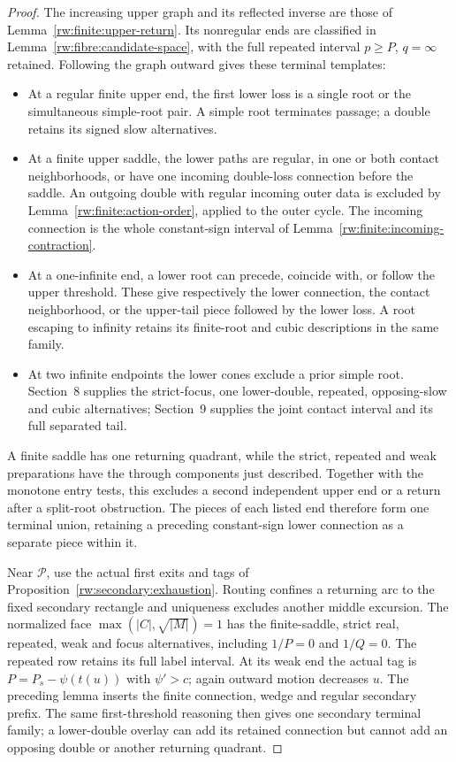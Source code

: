 \begin{proof}
The increasing upper graph and its reflected inverse are those of
Lemma~\ref{rw:finite:upper-return}. Its nonregular ends are classified
in Lemma~\ref{rw:fibre:candidate-space}, with the full repeated
interval $p\ge P$, $q=\infty$ retained. Following the graph outward
gives these terminal templates:
\begin{itemize}
\item At a regular finite upper end, the first lower loss is a
single root or the simultaneous simple-root pair. A simple root
terminates passage; a double retains its signed slow alternatives.
\item At a finite upper saddle, the lower paths are regular, in
one or both contact neighborhoods, or have one incoming double-loss
connection before the saddle. An outgoing double with regular
incoming outer data is excluded by
Lemma~\ref{rw:finite:action-order}, applied to the outer cycle.
The incoming connection is the whole constant-sign interval of
Lemma~\ref{rw:finite:incoming-contraction}.
\item At a one-infinite end, a lower root can precede, coincide
with, or follow the upper threshold. These give respectively the
lower connection, the contact neighborhood, or the upper-tail piece
followed by the lower loss. A root escaping to infinity retains
its finite-root and cubic descriptions in the same family.
\item At two infinite endpoints the lower cones exclude a prior
simple root. Section~8 supplies the strict-focus, one lower-double,
repeated, opposing-slow and cubic alternatives; Section~9 supplies
the joint contact interval and its full separated tail.
\end{itemize}
A finite saddle has one returning quadrant, while the strict,
repeated and weak preparations have the through components just
described. Together with the monotone entry tests, this excludes a
second independent upper end or a return after a split-root
obstruction. The pieces of each listed end therefore form one
terminal union, retaining a preceding constant-sign lower connection
as a separate piece within it.

Near $\mathcal P$, use the actual first exits and tags of
Proposition~\ref{rw:secondary:exhaustion}. Routing confines a
returning arc to the fixed secondary rectangle and uniqueness
excludes another middle excursion. The normalized face
$\max(|C|,\sqrt{|M|})=1$ has the finite-saddle, strict real,
repeated, weak and focus alternatives, including $1/P=0$ and
$1/Q=0$. The repeated row retains its full label interval.
At its weak end the actual tag is $P=P_s-\psi(t(u))$ with
$\psi'>c$; again outward motion decreases $u$.
The preceding lemma inserts the finite connection, wedge and
regular secondary prefix. The same first-threshold reasoning then
gives one secondary terminal family; a lower-double overlay can
add its retained connection but cannot add an opposing double or
another returning quadrant.


\end{proof}
